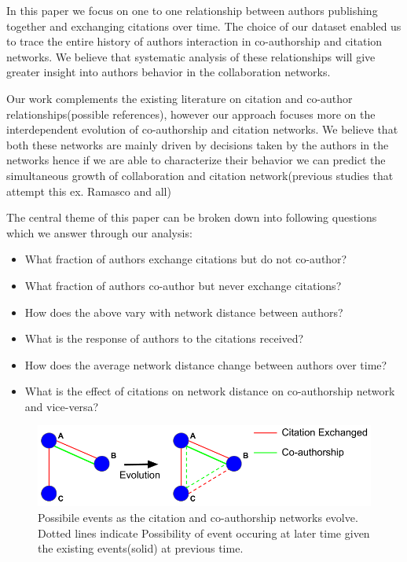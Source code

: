 \documentclass[aps, pre, twocolumn, nofootinbib]{revtex4-1}
\begin{document}
In this paper we focus on one to one relationship between authors publishing together and exchanging citations over time. The choice of our dataset enabled us to trace the entire history of authors interaction in co-authorship and citation networks. We believe that systematic analysis of these relationships will give greater insight into authors behavior in the collaboration networks. 

Our work complements the existing literature on citation and co-author relationships(possible references), however our approach focuses more on the interdependent evolution of co-authorship and citation networks. We believe that both these networks are mainly driven by decisions taken by the authors in the networks hence if we are able to characterize their behavior we can predict the simultaneous growth of collaboration and citation network(previous studies that attempt this ex. Ramasco and all)

The central theme of this paper can be broken down into following questions which we answer through our analysis:

\begin{itemize}
	\item What fraction of authors exchange citations but do not co-author?
	\item What fraction of authors co-author but never exchange citations?
	\item How does the above vary with network distance between authors?
	\item What is the response of authors to the citations received?
	\item How does the average network distance change between authors over time?
	\item What is the effect of citations on network distance on co-authorship network and vice-versa?
\end{itemize}

\begin{figure}
	\centering
	\includegraphics[scale = 0.28]{plots/goals}
	
	\captionsetup{singlelinecheck=false, justification=raggedright,  labelsep=space}
	\caption{Possibile events as the citation and co-authorship networks evolve. Dotted lines indicate Possibility of event occuring at later time given the existing events(solid) at previous time.}
	\label{f1}
\end{figure}
\end{document}
